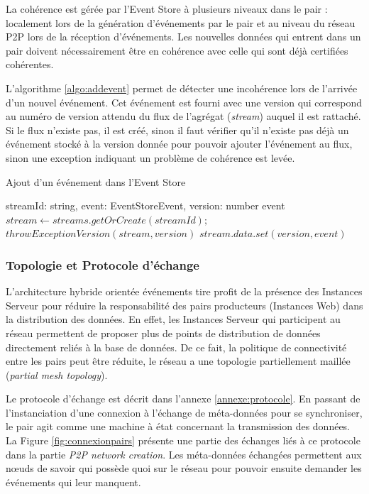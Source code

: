 La cohérence est gérée par l'Event Store à plusieurs niveaux dans le pair :  
localement lors de la génération d'événements par le pair et au niveau du réseau 
\gls{P2P} lors de la réception d'événements.
Les nouvelles données qui entrent dans un pair doivent nécessairement être en 
cohérence avec celle qui sont déjà certifiées cohérentes.

L'algorithme \ref{algo:addevent} permet de détecter une incohérence lors de 
l'arrivée d'un nouvel événement. Cet événement est fourni avec une version qui 
correspond au numéro de version attendu du flux de l'agrégat 
(\textit{stream}) auquel il est rattaché. Si le flux n'existe pas, il est créé, sinon il 
faut vérifier qu'il n'existe pas déjà un événement stocké à la version donnée pour 
pouvoir ajouter l'événement au flux, sinon une exception indiquant un problème de 
cohérence est levée.

\begin{algorithm} %
	\caption{Ajout d'un événement dans l'Event Store} %
	\label{algo:addevent} %
	\begin{algorithmic} %
		\Require streamId: string, event: EventStoreEvent, version: number
		\Ensure event
		\State $stream \leftarrow streams.getOrCreate(streamId);$
		\State $throwExceptionVersion(stream,version)$
		\EndIf
		\State $stream.data.set(version,event) $
	\end{algorithmic}
\end{algorithm}

\subsubsection{Topologie et Protocole d'échange}
L'architecture hybride orientée \og événements\fg{} tire profit de la présence des 
Instances Serveur pour réduire la responsabilité des pairs producteurs (Instances 
Web) dans la distribution des données. En effet, les Instances Serveur qui 
participent au réseau permettent de proposer plus de points de distribution de 
données directement reliés à la base de données. De ce fait, la politique de 
connectivité entre les pairs peut être réduite, le réseau a une topologie 
partiellement maillée (\textit{partial mesh topology}). 

Le protocole d'échange est décrit dans l'annexe \ref{annexe:protocole}. En passant 
de l'instanciation d'une connexion à l'échange de méta-données pour se 
synchroniser, le pair agit comme une machine à état concernant la transmission 
des données. La Figure \ref{fig:connexionpairs} présente une partie des échanges 
liés à ce protocole dans la partie \textit{\gls{P2P} network creation}. Les 
méta-données échangées permettent aux n\oe uds de savoir \og qui possède 
quoi\fg{} sur le réseau pour pouvoir ensuite demander les événements qui leur 
manquent. 


